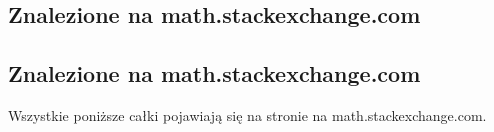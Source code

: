 %

\subsection{Znalezione na math.stackexchange.com}
\subsection{Znalezione na math.stackexchange.com}
Wszystkie poniższe całki pojawiają się na stronie na math.stackexchange.com.

%